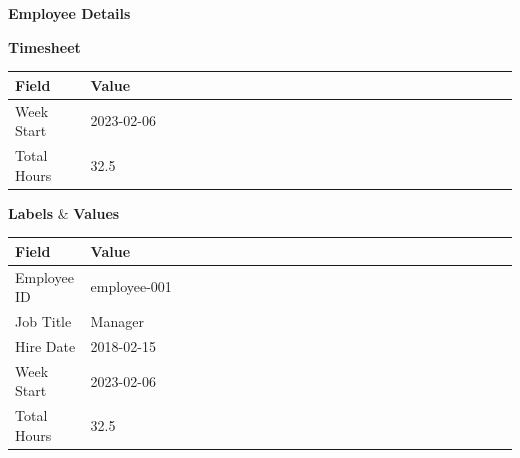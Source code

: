 \documentclass{article}
\begin{document}
\begin{multicols}{2}
\columnbreak

\textbf{Employee Details}\\

\begin{minipage}[t]{0.5\textwidth}
\vspace*{-1em}
\textbf{Timesheet}\\
\begin{longtable}{|C{0.15\linewidth}|L{0.85\linewidth}|}
  \hline
  \textbf{Field} & \textbf{Value} \\
  \hline
  Week Start & 2023-02-06 \\
  Total Hours & 32.5 \\
  \hline
  \end{longtable}
\vspace*{-1em}
\end{minipage}

\begin{minipage}[t]{0.45\textwidth}
\vspace*{-1em}
\textbf{Labels} & \textbf{Values}\\
\begin{tabularx}{\linewidth}{|C{0.15\linewidth}|L{0.85\linewidth}|}
  \hline
  \textbf{Field} & \textbf{Value} \\
  \hline
  Employee ID & employee-001 \\
  Job Title & Manager \\
  Hire Date & 2018-02-15 \\
  Week Start & 2023-02-06 \\
  Total Hours & 32.5 \\
  \hline
  \end{tabularx}
\vspace*{-1em}
\end{minipage}


\end{multicols}
\end{document}
